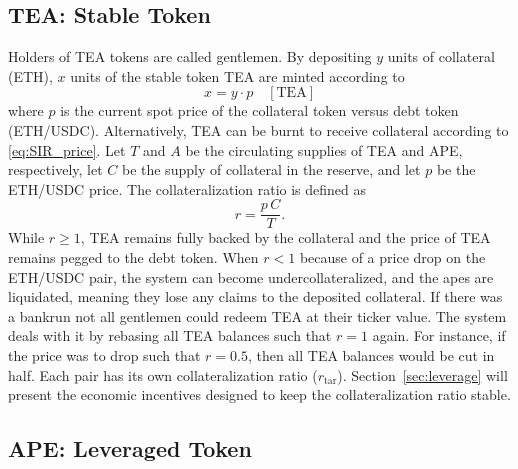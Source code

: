 \documentclass[journal,letterpaper,oneside,onecolumn,12pt]{IEEEtran}
\begin{document}
	



	\subsection{TEA: Stable Token}

	Holders of TEA tokens are called gentlemen.
	By depositing $y$ units of collateral (ETH), $x$ units of the stable token TEA are minted according to
	\begin{equation} \label{eq:SIR_price} 
		x = y \cdot p \quad[\text{TEA}] 
	\end{equation}
	where $p$ is the current spot price of the collateral token versus debt token (ETH/USDC).	
	Alternatively, TEA can be burnt to receive collateral according to \eqref{eq:SIR_price}.
	Let $T$ and $A$ be the circulating supplies of TEA and APE, respectively, let $C$ be the supply of collateral in the reserve, and let $p$ be the ETH/USDC price. The collateralization ratio is defined as
	\begin{equation} \label{eq:collateralization_factor}
		r = \frac{p\,C}{T}.
	\end{equation}
	While $r\geq1$, TEA remains fully backed by the collateral and the price of TEA remains pegged to the debt token. When $r<1$ because of a price drop on the ETH/USDC pair, the system can become undercollateralized, and the apes are liquidated, meaning they lose any claims to the deposited collateral. If there was a bankrun not all gentlemen could redeem TEA at their ticker value. The system deals with it by rebasing all TEA balances such that $r=1$ again. For instance, if the price was to drop such that $r=0.5$, then all TEA balances would be cut in half. Each pair has its own collateralization ratio ($r_\textrm{tar}$). Section~\ref{sec:leverage} will present the economic incentives designed to keep the collateralization ratio stable.
	

	
	\subsection{APE: Leveraged Token} \label{sec:APE}
	
\end{document}
